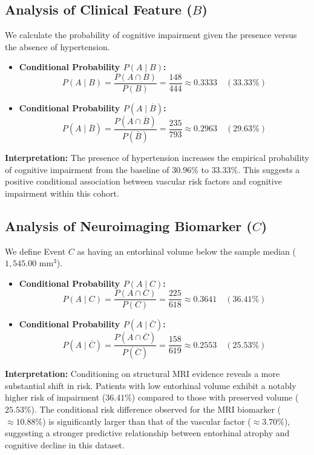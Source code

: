 \documentclass[11pt, a4paper]{article}
\begin{document}
\subsection{Analysis of Clinical Feature ($B$)}
We calculate the probability of cognitive impairment given the presence versus the absence of hypertension.
\begin{itemize}
    \item \textbf{Conditional Probability $P(A \mid B)$:}
    \[
    P(A \mid B) = \frac{P(A \cap B)}{P(B)} = \frac{148}{444} \approx 0.3333 \quad (33.33\%)
    \]
    \item \textbf{Conditional Probability $P(A \mid \overline{B})$:}
    \[
    P(A \mid \overline{B}) = \frac{P(A \cap \overline{B})}{P(\overline{B})} = \frac{235}{793} \approx 0.2963 \quad (29.63\%)
    \]
\end{itemize}
\textbf{Interpretation:} The presence of hypertension increases the empirical probability of cognitive impairment from the baseline of $30.96\%$ to $33.33\%$. This suggests a positive conditional association between vascular risk factors and cognitive impairment within this cohort.

\subsection{Analysis of Neuroimaging Biomarker ($C$)}
We define Event $C$ as having an entorhinal volume below the sample median ($1,545.00\text{ mm}^3$).
\begin{itemize}
    \item \textbf{Conditional Probability $P(A \mid C)$:}
    \[
    P(A \mid C) = \frac{P(A \cap C)}{P(C)} = \frac{225}{618} \approx 0.3641 \quad (36.41\%)
    \]
    \item \textbf{Conditional Probability $P(A \mid \overline{C})$:}
    \[
    P(A \mid \overline{C}) = \frac{P(A \cap \overline{C})}{P(\overline{C})} = \frac{158}{619} \approx 0.2553 \quad (25.53\%)
    \]
\end{itemize}
\textbf{Interpretation:} Conditioning on structural MRI evidence reveals a more substantial shift in risk. Patients with low entorhinal volume exhibit a notably higher risk of impairment ($36.41\%$) compared to those with preserved volume ($25.53\%$). The conditional risk difference observed for the MRI biomarker ($\approx 10.88\%$) is significantly larger than that of the vascular factor ($\approx 3.70\%$), suggesting a stronger predictive relationship between entorhinal atrophy and cognitive decline in this dataset.
\end{document}
